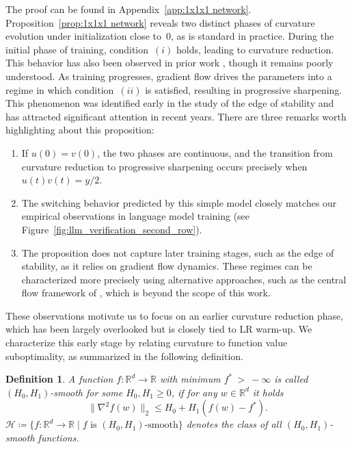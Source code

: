 \documentclass[a4paper,11pt]{article}
\newcommand{\cH}{\mathcal{H}}
\newcommand{\R}{\mathbb{R}}
\newcommand{\1}{\mathbbm{1}}
\newcommand{\eqdef}{\coloneqq}
\theoremstyle{plain}
\newtheorem{definition}{Definition}[section]
\begin{document}
The proof can be found in Appendix~\ref{app:1x1x1 network}. Proposition~\ref{prop:1x1x1 network} reveals two distinct phases of curvature evolution under initialization close to~$0$, as is standard in practice. During the initial phase of training, condition~$(i)$ holds, leading to curvature reduction. This behavior has also been observed in prior work \citep{kalra2023universal,kalra2024warmup}, though it remains poorly understood. As training progresses, gradient flow drives the parameters into a regime in which condition~$(ii)$ is satisfied, resulting in progressive sharpening. This phenomenon was identified early in the study of the edge of stability \citep{cohen2021gradient} and has attracted significant attention in recent years. There are three remarks worth highlighting about this proposition:

\begin{enumerate}
\item If $u(0)=v(0)$, the two phases are continuous, and the transition from curvature reduction to progressive sharpening occurs precisely when $u(t)v(t)=y/2$.

\item The switching behavior predicted by this simple model closely matches our empirical observations in language model training (see Figure~\ref{fig:llm_verification_second_row}).

\item The proposition does not capture later training stages, such as the edge of stability, as it relies on gradient flow dynamics. These regimes can be characterized more precisely using alternative approaches, such as the central flow framework of \citet{cohenunderstanding},  which is beyond the scope of this work.
\end{enumerate}


These observations motivate us to focus on an earlier curvature reduction phase, which has been largely overlooked but is closely tied to LR warm-up. We characterize this early stage by relating curvature to function value suboptimality, as summarized in the following definition.


\begin{definition}\label{asmp:H0H1_smoothness}
    A function $f \colon\R^d\to\R$ with minimum $f^*~>~-\infty$ is called $(H_0, H_1)$-smooth for some $H_0,H_1\ge 0$, if for any $w\in\R^d$ it holds
    \begin{equation*}
    \|\nabla^2f(w)\|_2 \le H_0 + H_1(f(w) - f^*).
    \end{equation*}
    $\cH\eqdef \{f\colon\R^d\to\R\mid f\text{ is }(H_0,H_1)\text{-smooth}\}$ denotes the class of all $(H_0,H_1)$-smooth functions.
\end{definition}
\end{document}
